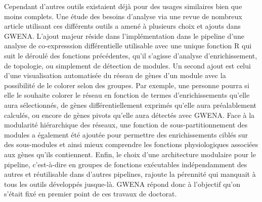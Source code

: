 Cependant d'autres outils existaient déjà pour des usages similaires bien que moins complets. Une étude des besoins d'analyse via une revue de nombreux article utilisant ces différents outils a amené à plusieurs choix et ajouts dans GWENA. L'ajout majeur réside dans l'implémentation dans le pipeline d'une analyse de co-expresssion différentielle utilisable avec une unique fonction R qui suit le déroulé des fonctions précédentes, qu'il s'agisse d'analyse d'enrichissement, de topologie, ou simplement de détection de modules. Un second ajout est celui d'une visualisation automatisée du réseau de gènes d'un module avec la possibilité de le colorer selon des groupes. Par exemple, une personne pourra si elle le souhaite colorer le réseau en fonction de termes d'enrichissements qu'elle aura sélectionnés, de gènes différentiellement exprimés qu'elle aura préalablement calculés, ou encore de gènes pivots qu'elle aura détectés avec GWENA. Face à la modularité hiérarchique des réseaux, une fonction de sous-partitionnement des modules a également été ajoutée pour permettre des enrichissements ciblés sur des sous-modules et ainsi mieux comprendre les fonctions physiologiques associées aux gènes qu'ils contiennent. Enfin, le choix d'une architecture modulaire pour le pipeline, c’est-à-dire en groupes de fonctions exécutables indépendamment des autres et réutilisable dans d'autres pipelines, rajoute la pérennité qui manquait à tous les outils développés jusque-là. GWENA répond donc à l'objectif qu'on s'était fixé en premier point de ces travaux de doctorat.

